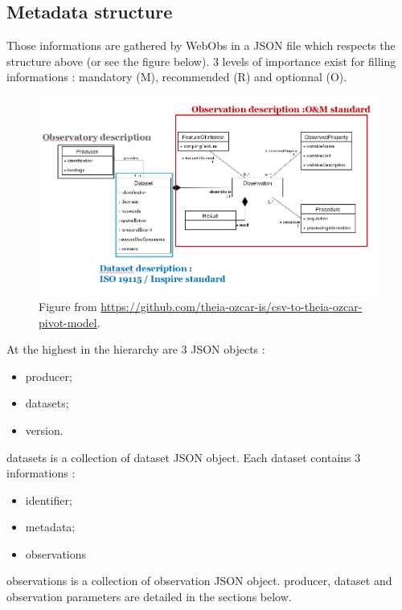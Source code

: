 \subsection{Metadata structure}

Those informations are gathered by WebObs in a JSON file which respects the structure above (or see the figure below). 3 levels of importance exist for filling informations : mandatory (M), recommended (R) and optionnal (O).

\begin{figure}[!h]
	\centering
	\includegraphics[width=\textwidth]{figures/theia_pivot_model.png}
	\caption{Figure from \url{https://github.com/theia-ozcar-is/csv-to-theia-ozcar-pivot-model}.}
\end{figure}


At the highest in the hierarchy are 3 JSON objects : 

\begin{itemize}
\item 	 producer;
\item 	 datasets;
\item 	 version.
\end{itemize}

datasets is a collection of dataset JSON object. Each dataset contains 3 informations : 

\begin{itemize}
\item 	 identifier;
\item 	 metadata;
\item 	 observations
\end{itemize}

observations is a collection of observation JSON object. producer, dataset and observation parameters are detailed in the sections below. 


